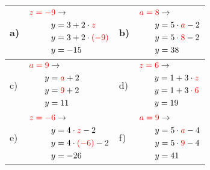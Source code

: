 \documentclass[12pt]{article}
\begin{document}
\begin{xltabular}{\textwidth}{|C{0.75cm}|X|C{0.75cm}|X|}
\hline
a)&$\begin{aligned}
\textcolor{red}{z=-9} & \rightarrow\\
y&=3 + 2 \cdot \textcolor{red}{z}\\
y&=3 + 2 \cdot \textcolor{red}{(-9)}\\
y&=-15\\
\end{aligned}$
&
b)&$\begin{aligned}
\textcolor{red}{a=8} & \rightarrow\\
y&=5 \cdot \textcolor{red}{a} - 2\\
y&=5 \cdot \textcolor{red}{8} - 2\\
y&=38\\
\end{aligned}$
\\\hline
c)&$\begin{aligned}
\textcolor{red}{a=9} & \rightarrow\\
y&=\textcolor{red}{a} + 2\\
y&=\textcolor{red}{9} + 2\\
y&=11\\
\end{aligned}$
&
d)&$\begin{aligned}
\textcolor{red}{z=6} & \rightarrow\\
y&=1 + 3 \cdot \textcolor{red}{z}\\
y&=1 + 3 \cdot \textcolor{red}{6}\\
y&=19\\
\end{aligned}$
\\\hline
e)&$\begin{aligned}
\textcolor{red}{z=-6} & \rightarrow\\
y&=4 \cdot \textcolor{red}{z} - 2\\
y&=4 \cdot \textcolor{red}{(-6)} - 2\\
y&=-26\\
\end{aligned}$
&
f)&$\begin{aligned}
\textcolor{red}{a=9} & \rightarrow\\
y&=5 \cdot \textcolor{red}{a} - 4\\
y&=5 \cdot \textcolor{red}{9} - 4\\
y&=41\\
\end{aligned}$
\\\hline

\end{xltabular}
\end{document}
